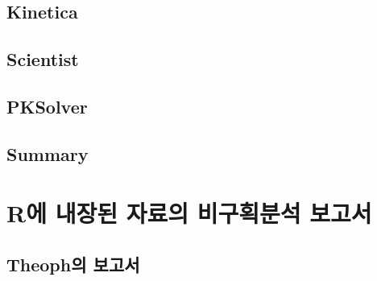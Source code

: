 \documentclass[
  10pt,
]{krantz}
\begin{document}
\hypertarget{kinetica}{%
\section{Kinetica}\label{kinetica}}

\hypertarget{scientist}{%
\section{Scientist}\label{scientist}}

\hypertarget{pksolver}{%
\section{PKSolver}\label{pksolver}}

\hypertarget{summary}{%
\section{Summary}\label{summary}}

\hypertarget{groupreport}{%
\chapter{R에 내장된 자료의 비구획분석 보고서}\label{groupreport}}

\hypertarget{theophgroup}{%
\section{Theoph의 보고서}\label{theophgroup}}
\end{document}
